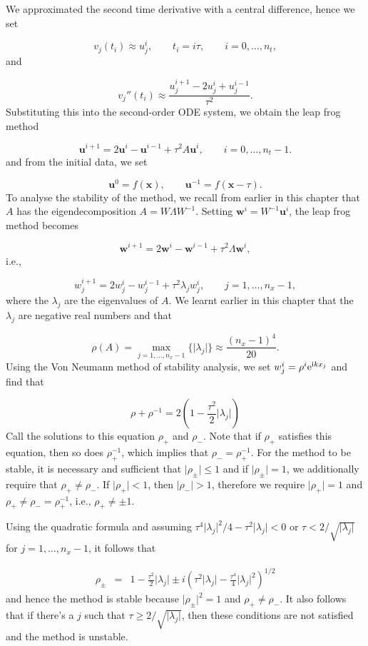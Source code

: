 \documentclass[12pt,a4paper]{article}
\begin{document}
We approximated the second time derivative with a central difference, hence we set

\[
v_j(t_i) \approx u^{i}_j, \qquad t_i = i\tau, \qquad i = 0, \ldots, n_t,
\]
and

\[
v_j''(t_i) \approx \frac{u^{i+1}_j - 2u^i_j + u^{i-1}_j}{\tau^2}.
\]
Substituting this into the second-order ODE system, we obtain the leap frog method

\[
\mathbf{u}^{i+1} = 2\mathbf{u}^{i} - \mathbf{u}^{i-1} + \tau^2 A\mathbf{u}^{i}, \qquad i = 0, \ldots, n_t-1.
\]
and from the initial data, we set

\[
\mathbf{u}^{0} = f(\mathbf{x}), \qquad \mathbf{u}^{-1} = f(\mathbf{x}-\tau).
\]
To analyse the stability of the method, we recall from earlier in this chapter that $A$ has the eigendecomposition $A = W\Lambda W^{-1}$. Setting $\mathbf{w}^i = W^{-1}\mathbf{u}^{i}$, the leap frog method becomes

\[
\mathbf{w}^{i+1} = 2\mathbf{w}^{i} - \mathbf{w}^{i-1} +  \tau^2\Lambda \mathbf{w}^{i},
\]
i.e.,

\[
w^{i+1}_j = 2w^{i}_j - w^{i-1}_j +  \tau^2\lambda_j w^{i}_j, \qquad j = 1, \ldots, n_x-1,
\]
where the $\lambda_j$ are the eigenvalues of $A$.  We learnt earlier in this chapter that the $\lambda_j$ are negative real numbers and that 

\[
\rho(A) = \max_{j = 1, \ldots, n_x-1} \lbrace \vert \lambda_j \vert  \rbrace \approx \frac{(n_x-1)^4}{20}.
\]
Using the Von Neumann method of stability analysis, we set $w^i_j = \rho^i {\rm e}^{{\rm i}kx_j}$ and find that

\[
\rho  + \rho^{-1} =  2\left(1 - \frac{\tau^2}{2} \vert \lambda_j \vert\right)
\]
Call the solutions to this equation $\rho_+$ and $\rho_-$. Note that if $\rho_+$ satisfies this equation, then so does $\rho^{-1}_+$, which implies that $\rho_- = \rho_+^{-1}$. For the method to be stable, it is necessary and sufficient that $\vert \rho_{\pm} \vert \leq 1$ and if $\vert \rho_{\pm} \vert = 1$, we additionally require that $\rho_{+} \neq \rho_{-}$.  If $\vert \rho_+ \vert < 1$, then $\vert \rho_- \vert > 1$, therefore we require $\vert \rho_+ \vert = 1$ and $\rho_+ \neq \rho_- = \rho_+^{-1}$, i.e., $\rho_+ \neq \pm 1$.

Using the quadratic formula and assuming $\tau^4\vert \lambda_j \vert^2/4 - \tau^2\vert \lambda_j \vert < 0$ or $\tau < 2/\sqrt{\vert \lambda_j \vert}$ for $j = 1, \ldots, n_x-1$, it follows that


\begin{eqnarray*}
\rho_{\pm}
&=& 1 - \frac{\tau^2}{2}\vert \lambda_j \vert  \pm i\left( \tau^2\vert \lambda_j \vert -\frac{\tau^4}{4}\vert \lambda_j \vert^2   \right)^{1/2}
\end{eqnarray*}
and hence the method is stable because $\vert \rho_{\pm} \vert^2 = 1$  and $\rho_+ \neq \rho_-$.  It also follows that if there's a $j$ such that $\tau \geq 2/\sqrt{\vert \lambda_j \vert}$, then these conditions are not satisfied and the method is unstable.
\end{document}
